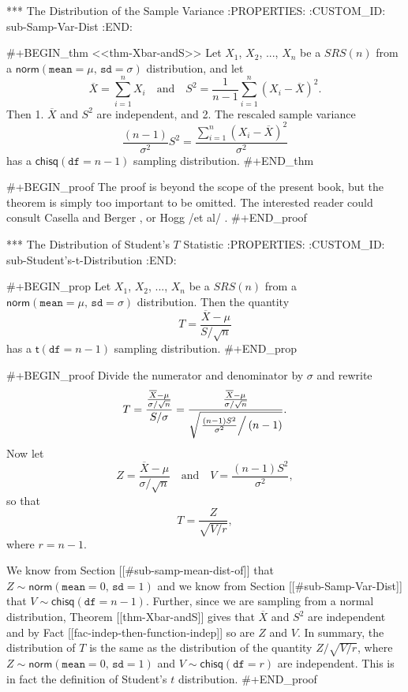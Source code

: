 *** The Distribution of the Sample Variance
:PROPERTIES:
:CUSTOM_ID: sub-Samp-Var-Dist
:END:

#+BEGIN_thm
<<thm-Xbar-andS>> Let \(X_{1}\), \(X_{2}\), ..., \(X_{n}\) be a
\(SRS(n)\) from a
\(\mathsf{norm}(\mathtt{mean}=\mu,\,\mathtt{sd}=\sigma)\)
distribution, and let
\begin{equation}
\overline{X}=\sum_{i=1}^{n}X_{i}\quad \mbox{and}\quad S^{2}=\frac{1}{n-1}\sum_{i=1}^{n}(X_{i}-\overline{X})^{2}.
\end{equation}
Then
1. \(\overline{X}\) and \(S^{2}\) are independent, and
2. The rescaled sample variance
    \begin{equation}
    \frac{(n-1)}{\sigma^{2}}S^{2}=\frac{\sum_{i=1}^{n}(X_{i}-\overline{X})^{2}}{\sigma^{2}}
    \end{equation}
    has a \(\mathsf{chisq}(\mathtt{df}=n-1)\) sampling distribution.
#+END_thm

#+BEGIN_proof
The proof is beyond the scope of the present book, but the theorem is
simply too important to be omitted. The interested reader could
consult Casella and Berger \cite{Casella2002}, or Hogg /et al/
\cite{Hogg2005}.
#+END_proof

*** The Distribution of Student's \(T\) Statistic
:PROPERTIES:
:CUSTOM_ID: sub-Student's-t-Distribution
:END:

#+BEGIN_prop
Let \(X_{1}\), \(X_{2}\), ..., \(X_{n}\) be a \(SRS(n)\) from a
\(\mathsf{norm}(\mathtt{mean}=\mu,\,\mathtt{sd}=\sigma)\)
distribution. Then the quantity
\begin{equation}
T=\frac{\overline{X}-\mu}{S/\sqrt{n}}
\end{equation}
has a \(\mathsf{t}(\mathtt{df}=n-1)\) sampling distribution.
#+END_prop

#+BEGIN_proof
Divide the numerator and denominator by \(\sigma\) and rewrite \[
T=\frac{\frac{\overline{X}-\mu}{\sigma/\sqrt{n}}}{S/\sigma}=\frac{\frac{\overline{X}-\mu}{\sigma/\sqrt{n}}}{\sqrt{\left.\frac{(n-1)S^{2}}{\sigma^{2}}\right/
(n-1)}}.  \] Now let \[
Z=\frac{\overline{X}-\mu}{\sigma/\sqrt{n}}\quad \mbox{and}\quad
V=\frac{(n-1)S^{2}}{\sigma^{2}}, \] so that
\begin{equation}
T=\frac{Z}{\sqrt{V/r}},
\end{equation}
where \(r=n-1\).

We know from Section [[#sub-samp-mean-dist-of]] that
\(Z\sim\mathsf{norm}(\mathtt{mean}=0,\,\mathtt{sd}=1)\) and we know
from Section [[#sub-Samp-Var-Dist]] that
\(V\sim\mathsf{chisq}(\mathtt{df}=n-1)\). Further, since we are
sampling from a normal distribution, Theorem [[thm-Xbar-andS]] gives
that \(\overline{X}\) and \(S^{2}\) are independent and by Fact
[[fac-indep-then-function-indep]] so are \(Z\) and \(V\). In summary,
the distribution of \(T\) is the same as the distribution of the
quantity \(Z/\sqrt{V/r}\), where
\(Z\sim\mathsf{norm}(\mathtt{mean}=0,\,\mathtt{sd}=1)\) and
\(V\sim\mathsf{chisq}(\mathtt{df}=r)\) are independent. This is in
fact the definition of Student's \(t\) distribution.
#+END_proof

